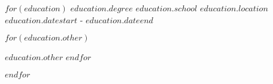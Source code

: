 \documentclass[11pt, a4paper]{awesome-cv}
\begin{document}

\begin{cventries}
$for(education)$
    \cventry
    {$education.degree$} %
    {$education.school$} %
    {$education.location$} %
    {$education.datestart$ - $education.dateend$} %
    {
      \begin{cvitems} %
        $for(education.other)$
        \item{$education.other$}
        $endfor$
      \end{cvitems}
    }
    \linebreak
$endfor$
\end{cventries}
\end{document}
